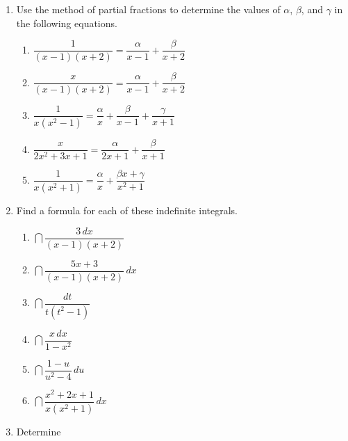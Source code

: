 \begin{enumerate}
\item Use the method of partial fractions to determine the values of
$\alpha$, $\beta$, and $\gamma$ in the following equations.



  \begin{enumerate}
  \item $\dfrac{1}{(x - 1)(x + 2)} = \dfrac{\alpha}{x - 1} +
	\dfrac{\beta}{x + 2}$
	

  \item $\dfrac{x}{(x - 1)(x + 2)} = \dfrac{\alpha}{x - 1} +
	\dfrac{\beta}{x + 2}$


  \item $\dfrac{1}{x(x^2-1)} = \dfrac{\alpha}{x} +
	\dfrac{\beta}{x-1} + \dfrac{\gamma}{x+1}$

  \item $\dfrac{x}{2x^2 +3x + 1} = \dfrac{\alpha}{2x + 1} +
	\dfrac{\beta}{x + 1}$


  \item $\dfrac{1}{x(x^2 + 1)} = \dfrac{\alpha}{x} +
	\dfrac{\beta x + \gamma}{x^2 + 1}$




\vfill
\mbox{}

\mbox{}

\pagebreak


\end{enumerate}
\item Find a formula for each of these indefinite integrals.




  \begin{enumerate}
  \item $\dint \dfrac{3 \, dx}{(x - 1)(x + 2)}$


  \item $\dint \dfrac{5x + 3}{(x - 1)(x + 2)} \, dx$


  \item $\dint \dfrac{dt}{t(t^2-1)}$

  \item $\dint \dfrac{x \, dx}{1 - x^2}$


  \item $\dint \dfrac{1 - u}{u^2 - 4} \, du$


  \item $\dint \dfrac{x^2 + 2x + 1}{x(x^2 + 1)} \, dx$
\mbox{}


\end{enumerate}
\item Determine





\end{enumerate}
